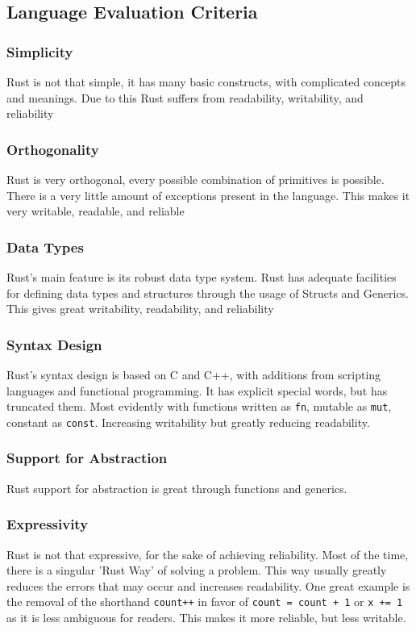 \documentclass{article}
\newcommand{\rustin}[1]{\texttt{#1}}
\begin{document}
  \subsection{Language Evaluation Criteria}

  \subsubsection{Simplicity}
  Rust is not that simple, it has many basic constructs, with complicated
  concepts and meanings. Due to this Rust suffers from readability, writability,
  and reliability

  \subsubsection{Orthogonality}
  Rust is very orthogonal, every possible combination of primitives is possible.
  There is a very little amount of exceptions present in the language. This
  makes it very writable, readable, and reliable

  \subsubsection{Data Types}
  Rust's main feature is its robust data type system. Rust has adequate
  facilities for defining data types and structures through the usage of Structs
  and Generics. This gives great writability, readability, and reliability

  \subsubsection{Syntax Design}
  Rust's syntax design is based on C and C++, with additions from scripting
  languages and functional programming. It has explicit special words, but has
  truncated them. Most evidently with functions written as \rustin{fn}, mutable
  as \rustin{mut}, constant as \rustin{const}. Increasing writability but
  greatly reducing readability.

  \subsubsection{Support for Abstraction}
  Rust support for abstraction is great through functions and generics.

  \subsubsection{Expressivity}
  Rust is not that expressive, for the sake of achieving reliability. Most of
  the time, there is a singular 'Rust Way' of solving a problem. This way
  usually greatly reduces the errors that may occur and increases readability.
  One great example is the removal of the shorthand \texttt{count++} in
  favor of \rustin{count = count + 1} or \rustin{x += 1} as it is less ambiguous
  for readers. This makes it more reliable, but less writable.
\end{document}
